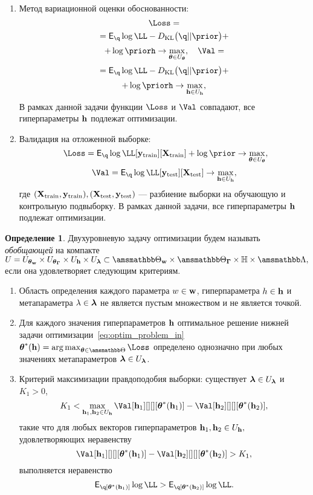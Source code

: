 \documentclass[11pt, a5paper]{dissert}
\theoremstyle{definition}
\newtheorem{defin}{Определение}
\DeclareMathOperator*{\argmax}{arg\,max}
\begin{document}
{\begin{enumerate}
\item Метод вариационной оценки обоснованности:
\begin{equation}
\label{eq:optim_elbo_method}   
    \Loss = 
\end{equation}
\[
= \E_{\q} \log \LL - \KL{\q}{\prior} + 
\]
\[
+\log\priorh \to \max_{\teta \in \Uteta}, \quad    \Val = 
\]
\[
= \E_{\q} \log \LL - \KL{\q}{\prior} +
\]
\[+ \log\priorh \to \max_{\h \in \Uh},
\]
В рамках данной задачи функции $\Loss$ и $\Val$ совпадают, все гиперпараметры $\mathbf{h}$ подлежат оптимизации.

\item Валидация на отложенной выборке:
\begin{equation}
\label{eq:optim_hold_out}
    \Loss = \E_{\q} \log \LL[\y_\text{train}][\X_\text{train}] + \log \prior \to \max_{\teta \in \Uteta},
\end{equation}
\[
    \Val = \E_{\q} \log \LL[\y_\text{test}][\X_\text{test}] \to \max_{\h \in \Uh},
\]
где $(\mathbf{X}_\text{train}, \mathbf{y}_\text{train}), (\mathbf{X}_\text{test}, \mathbf{y}_\text{test})$ --- разбиение выборки на обучающую и контрольную подвыборку.
В рамках данной задачи, все гиперпараметры $\mathbf{h}$ подлежат оптимизации.

\end{enumerate}

\begin{defin}
Двухуровневую задачу оптимизации будем называть \textit{обобщающей} на компакте $U = \Utetaw \times \UtetaG \times \Uh \times \Ulam \subset \Tetawb \times \TetaGb \times \Hb \times \Lamb,$ если она удовлетворяет следующим критериям.
\begin{enumerate}
\item Область определения каждого параметра $w \in \mathbf{w}$, гиперпараметра $h \in \mathbf{h}$ и метапараметра $\lambda \in \boldsymbol{\lambda}$ не  является пустым множеством и не является точкой.
\item Для каждого значения гиперпараметров $\mathbf{h}$ оптимальное решение нижней задачи оптимизации~\eqref{eq:optim_problem_in} 
$
\teta^{*}(\h) = \argmax_{\teta \in \Tetab} \Loss
$
определено однозначно при любых значениях метапараметров $\boldsymbol{\lambda} \in U_{\boldsymbol{\lambda}}$.

\item Критерий максимизации правдоподобия выборки: существует $\boldsymbol{\lambda} \in U_{\boldsymbol{\lambda}}$ и  $K_1>0$,$$K_1 < \max_{\h_1,\h_2 \in \Uh} \Val[\h_1][][][\teta^{*}(\h_1)] - \Val[\h_2][][][\teta^{*}(\h_2)],$$ такие что для любых векторов гиперпараметров $\mathbf{h}_1, \mathbf{h}_2 \in U_{\mathbf{h}},$ удовлетворяющих неравенству $$\Val[\h_1][][][\teta^{*}(\h_1)] - \Val[\h_2][][][\teta^{*}(\h_2)] > K_1,$$ выполняется неравенство $$\E_{\q[\teta^{*}(\h_1)]}\log\LL > \E_{\q[\teta^{*}(\h_2)]}\log\LL.$$


\end{enumerate}
\end{defin}}
\end{document}
